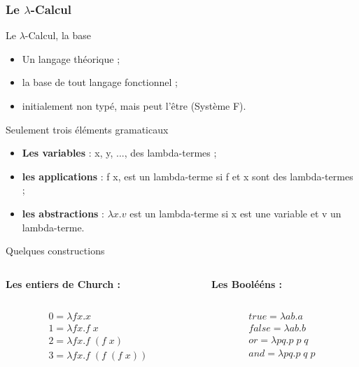 \documentclass{beamer}
\begin{document}
	\subsubsection{Le $\lambda$-Calcul}
	\begin{frame}{Le $\lambda$-Calcul, la base}
		\begin{itemize}
			\item Un langage théorique ;
			\item la base de tout langage fonctionnel ;
			\item initialement non typé, mais peut l'être (Système F).
		\end{itemize}
		Seulement trois éléments gramaticaux
		\begin{itemize}
			\item \textbf{Les variables} : x, y, ..., des lambda-termes ;
			\item \textbf{les applications} :  f x, est un lambda-terme si f et x sont des lambda-termes ;
			\item \textbf{les abstractions} :  $\lambda x.v$ est un lambda-terme si x est une variable et v un lambda-terme.
		\end{itemize}
	\end{frame}

	\begin{frame}{Quelques constructions}

		\begin{columns}[t]
			\begin{column}{5cm}
				\textbf{Les entiers de Church :}
			\end{column}
			\begin{column}{5cm}
				\textbf{Les Boolééns :}
			\end{column}

		\end{columns}

		\begin{columns}[t]
 			\begin{column}{5cm}

				\begin{gather}
					0 = \lambda fx.x \\
					1 = \lambda fx.f \; x \\
					2 = \lambda fx.f \; (f \; x) \\
					3 = \lambda fx.f \; (f \; (f \; x)) \\
				\end{gather}

 			\end{column}

 			\begin{column}{5cm}

				\begin{gather}
					true = \lambda ab.a \\
					false = \lambda ab.b \\
					or = \lambda pq.p\;p\;q \\
					and = \lambda pq.p\;q\;p
				\end{gather}

 			\end{column}
		\end{columns}
	\end{frame}
\end{document}
